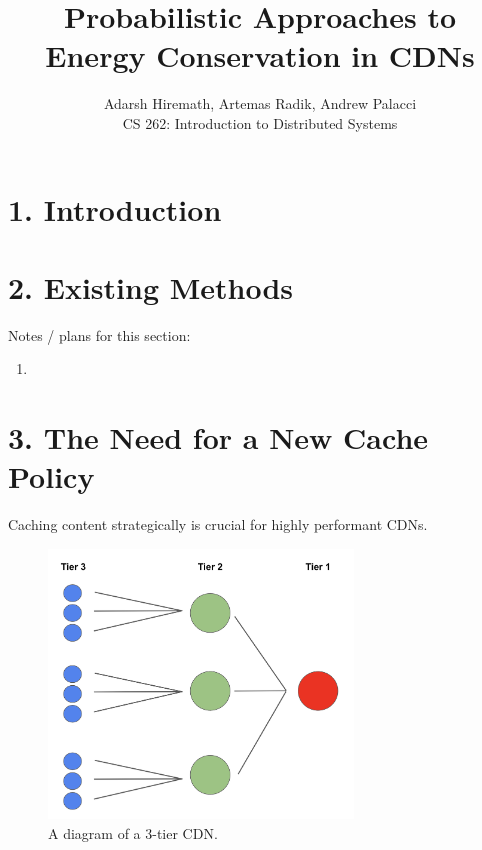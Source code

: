 \documentclass[
	a4paper, %
	10pt, %
	unnumberedsections, %
	twoside, %
]{LTJournalArticle}
\title{Probabilistic Approaches to 
\\ Energy Conservation in CDNs} %
\author{%
	Adarsh Hiremath, Artemas Radik, Andrew Palacci \\
	CS 262: Introduction to Distributed Systems \\
}
\begin{document}
\maketitle %


\begin{abstract}
\end{abstract}
\section{1. Introduction}

\section{2. Existing Methods}
Notes / plans for this section: 
\begin{enumerate}
    \item 
\end{enumerate}

\section{3. The Need for a New Cache Policy}

Caching content strategically is crucial for highly performant CDNs. 

\begin{figure}[h]
	\begin{center}
		\includegraphics[width=8.1cm]{tier.png}
	\end{center}
	\caption{A diagram of a 3-tier CDN.}
	\label{fig:tier-cdn}	
\end{figure}
\end{document}
